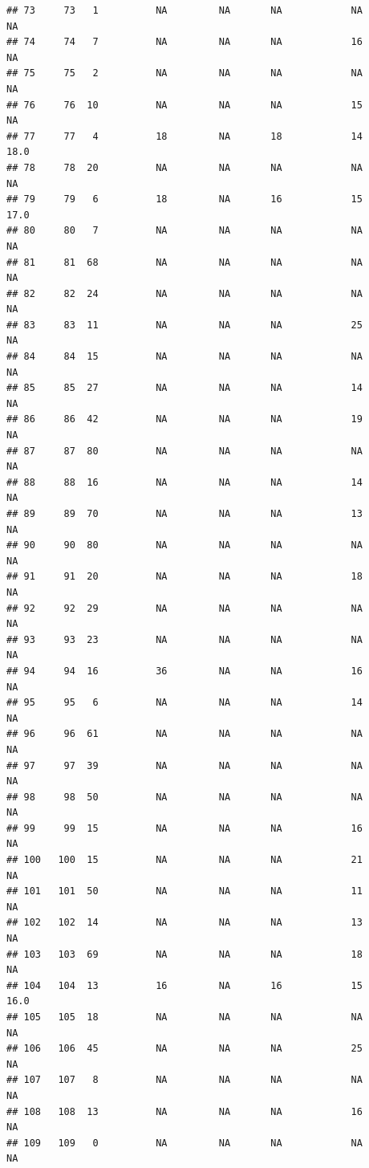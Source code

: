 \documentclass[man]{apa6}
\begin{document}
\begin{verbatim}
## 73     73   1          NA         NA       NA            NA       NA
## 74     74   7          NA         NA       NA            16       NA
## 75     75   2          NA         NA       NA            NA       NA
## 76     76  10          NA         NA       NA            15       NA
## 77     77   4          18         NA       18            14     18.0
## 78     78  20          NA         NA       NA            NA       NA
## 79     79   6          18         NA       16            15     17.0
## 80     80   7          NA         NA       NA            NA       NA
## 81     81  68          NA         NA       NA            NA       NA
## 82     82  24          NA         NA       NA            NA       NA
## 83     83  11          NA         NA       NA            25       NA
## 84     84  15          NA         NA       NA            NA       NA
## 85     85  27          NA         NA       NA            14       NA
## 86     86  42          NA         NA       NA            19       NA
## 87     87  80          NA         NA       NA            NA       NA
## 88     88  16          NA         NA       NA            14       NA
## 89     89  70          NA         NA       NA            13       NA
## 90     90  80          NA         NA       NA            NA       NA
## 91     91  20          NA         NA       NA            18       NA
## 92     92  29          NA         NA       NA            NA       NA
## 93     93  23          NA         NA       NA            NA       NA
## 94     94  16          36         NA       NA            16       NA
## 95     95   6          NA         NA       NA            14       NA
## 96     96  61          NA         NA       NA            NA       NA
## 97     97  39          NA         NA       NA            NA       NA
## 98     98  50          NA         NA       NA            NA       NA
## 99     99  15          NA         NA       NA            16       NA
## 100   100  15          NA         NA       NA            21       NA
## 101   101  50          NA         NA       NA            11       NA
## 102   102  14          NA         NA       NA            13       NA
## 103   103  69          NA         NA       NA            18       NA
## 104   104  13          16         NA       16            15     16.0
## 105   105  18          NA         NA       NA            NA       NA
## 106   106  45          NA         NA       NA            25       NA
## 107   107   8          NA         NA       NA            NA       NA
## 108   108  13          NA         NA       NA            16       NA
## 109   109   0          NA         NA       NA            NA       NA

\end{verbatim}
\end{document}
